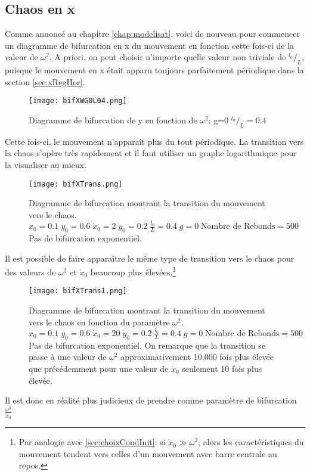 \documentclass[a4paper]{report}
\begin{document}
\subsection{Chaos en x}
Comme annoncé au chapitre \ref{chap:modelisat}, voici de nouveau pour commencer un diagramme de bifurcation en x du mouvement en fonction cette fois-ci de la valeur de \(\omega^2 \). A priori, on peut choisir n'importe quelle valeur non triviale de \(^{l_0}/_L\), puisque le mouvement en x était apparu toujours parfaitement périodique dans la section \ref{sec:xRegHor}.
\begin{figure}[h!]
   \texttt{[image: bifXWG0L04.png]}
      \caption[Diagramme de bifurcation de x en fonction de \(\omega ^2\): g=0, \(^{l_0}/_L=0.4\)]{Diagramme de bifurcation de y en fonction de \(\omega ^2\): g=0   \(^{l_0}/_L=0.4\)}
\end{figure}

Cette fois-ci, le mouvement n'apparaît plus du tout périodique. La transition vers la chaos s'opère très rapidement et il faut utiliser un graphe logarithmique pour la visualiser au mieux.
\begin{figure}[H]
   \texttt{[image: bifXTrans.png]}
      \caption[Transition du mouvement vers le chaos en fontion de \(\omega ^2 \): g=0]{Diagramme de bifurcation montrant la transition du mouvement vers le chaos.\\ \(x_0=0.1 \; y_0=0.6 \; \dot{x}_0=2 \; \dot{y}_0=0.2 \; \frac{l_0}{L}=0.4 \; g=0 \; \text{Nombre de Rebonds}=500\) Pas de bifurcation exponentiel.}
\end{figure}

Il est possible de faire apparaître le même type de transition vers le chaos pour des valeurs de \(\omega^2\) et \(\dot{x}_0\) beaucoup plus élevées.\footnote{Par analogie avec \ref{sec:choixCondInit}: si \(\dot{x}_0\gg\omega ^2\), alors les caractéristiques du mouvement tendent vers celles d'un mouvement avec barre centrale au repos.}
\begin{figure}[H]
   \texttt{[image: bifXTrans1.png]}
      \caption[Transition du mouvement vers le chaos pour une vitesse de départ en x plus élevée]{Diagramme de bifurcation montrant la transition du mouvement vers le chaos en fonction du paramètre \( \omega ^2 \).\\ \(x_0=0.1 \; y_0=0.6 \; \dot{x}_0=20 \; \dot{y}_0=0.2 \; \frac{l_0}{L}=0.4 \; g=0 \; \text{Nombre de Rebonds}=500\) Pas de bifurcation exponentiel. On remarque que la transition se passe à une valeur de \(\omega ^2\) approximativement 10.000 fois plus élevée que précédemment pour une valeur de \(\dot{x}_0\) seulement 10 fois plus élevée. }
\end{figure}
Il est donc en réalité plus judicieux de prendre comme paramètre de bifurcation \( \frac{ \omega ^2 }{\dot{x}_0}\)
\end{document}
